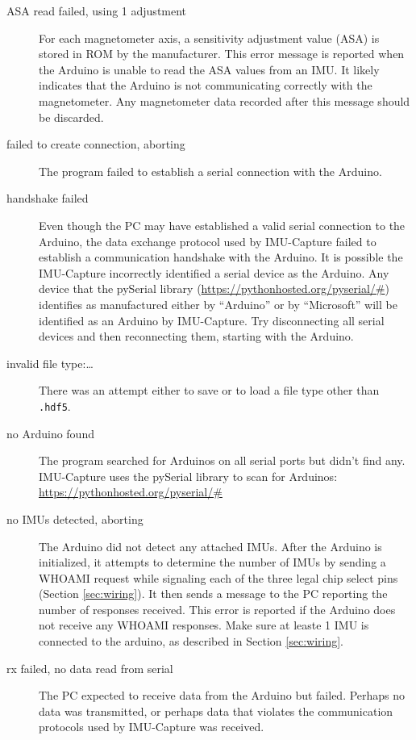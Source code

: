 \documentclass[11pt,letterpaper,article,oneside]{memoir}
\newcommand{\name}{IMU-Capture}
\newcommand{\hdf}{\texttt{.hdf5}}
\begin{document}
\begin{description}

\item[ASA read failed, using 1 adjustment]
For each magnetometer axis, a sensitivity adjustment value (ASA) is stored in
ROM by the manufacturer.  This error message is reported when the Arduino is
unable to read the ASA values from an IMU.  It likely indicates that the Arduino
is not communicating correctly with the magnetometer.  Any magnetometer data
recorded after this message should be discarded.
\genericFix{}

\item[failed to create connection, aborting]
The program failed to establish a serial connection with the Arduino.
\genericFix{}

\item[handshake failed]
Even though the PC may have established a valid serial connection to the
Arduino, the data exchange protocol used by \name{} failed to establish a
communication handshake with the Arduino.
\genericFix{}
It is possible the \name{} incorrectly identified a serial device as the
Arduino. Any device that the pySerial library
(\url{https://pythonhosted.org/pyserial/#}) identifies as manufactured either by
``Arduino'' or by ``Microsoft'' will be identified as an Arduino by \name{}. Try
disconnecting all serial devices and then reconnecting them, starting with the
Arduino.

\item[invalid file type:\ldots]
There was an attempt either to save or to load a file type other than
\hdf{}.

\item[no Arduino found]
The program searched for Arduinos on all serial ports but didn't find any.
\name{} uses the pySerial library to scan for Arduinos:
\url{https://pythonhosted.org/pyserial/#}

\item[no IMUs detected, aborting]
The Arduino did not detect any attached IMUs.  After the Arduino is initialized,
it attempts to determine the number of IMUs by sending a WHOAMI request while
signaling each of the three legal chip select pins (Section \ref{sec:wiring}).
It then sends a message to the PC reporting the number of responses received. This
error is reported if the Arduino does not receive any WHOAMI responses.
\genericFix{}
Make sure at leaste 1 IMU is connected to the arduino, as described in Section
\ref{sec:wiring}.

\item[rx failed, no data read from serial]
The PC expected to receive data from the Arduino but failed. Perhaps no data was
transmitted, or perhaps data that violates the communication protocols used by
\name{} was received.
\genericFix{}


\end{description}
\end{document}

